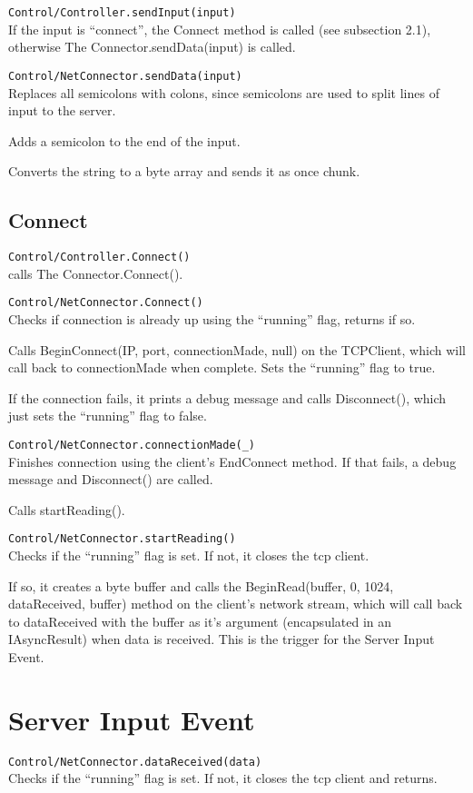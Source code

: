 \documentclass{article}
\begin{document}
		\texttt{Control/Controller.sendInput(input)}\\
			If the input is ``connect'', the Connect method is called (see subsection 2.1), otherwise The Connector.sendData(input) is called.
			
		\texttt{Control/NetConnector.sendData(input)}\\
			Replaces all semicolons with colons, since semicolons are used to split lines of input to the server.
			
			Adds a semicolon to the end of the input.
			
			Converts the string to a byte array and sends it as once chunk.
		
		\subsection{Connect}
		
			\texttt{Control/Controller.Connect()}\\
				calls The Connector.Connect().
				
			\texttt{Control/NetConnector.Connect()}\\
				Checks if connection is already up using the ``running'' flag, returns if so.
				
				Calls BeginConnect(IP, port, connectionMade, null) on the TCPClient, which will call back to connectionMade when complete. Sets the ``running'' flag to true.
				
				If the connection fails, it prints a debug message and calls Disconnect(), which just sets the ``running'' flag to false.
				
			\texttt{Control/NetConnector.connectionMade(\_)}\\
				Finishes connection using the client's EndConnect method. If that fails, a debug message and Disconnect() are called.
				
				Calls startReading().
				
			\texttt{Control/NetConnector.startReading()}\\
				Checks if the ``running'' flag is set. If not, it closes the tcp client.
				
				If so, it creates a byte buffer and calls the BeginRead(buffer, 0, 1024, dataReceived, buffer) method on the client's network stream, which will call back
				to dataReceived with the buffer as it's argument (encapsulated in an IAsyncResult) when data is received. This is the trigger for the Server Input Event.
	\section{Server Input Event}
		\texttt{Control/NetConnector.dataReceived(data)}\\
			Checks if the ``running'' flag is set. If not, it closes the tcp client and returns.
			
\end{document}
